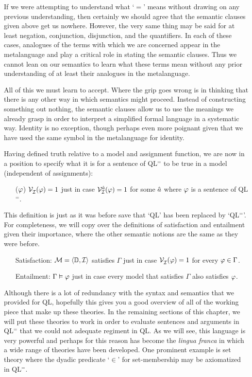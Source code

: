 If we were attempting to understand what `$=$' means without drawing on any previous understanding, then certainly we should agree that the semantic clauses given above get us nowhere.
However, the very same thing may be said for at least negation, conjunction, disjunction, and the quantifiers.
In each of these cases, analogues of the terms with which we are concerned appear in the metalanguage and play a critical role in stating the semantic clauses.
Thus we cannot lean on our semantics to learn what these terms mean without any prior understanding of at least their analogues in the metalanguage.

All of this we must learn to accept.
Where the grip goes wrong is in thinking that there is any other way in which semantics might proceed.
Instead of constructing something out nothing, the semantic clauses allow us to use the meanings we already grasp in order to interpret a simplified formal language in a systematic way.
Identity is no exception, though perhaps even more poignant given that we have used the same symbol in the metalanguage for identity.

Having defined truth relative to a model and assignment function, we are now in a position to specify what it is for a sentence of QL$^=$ to be true in a model (independent of assignments):

\begin{enumerate}[labelsep=.15in]
  \item[($\varphi$)] $\mathcal{V}_{\mathcal{I}}^{}(\varphi)=1$ just in case $\mathcal{V}_{\mathcal{I}}^{\hat{a}}(\varphi)=1$ for some $\hat{a}$ where $\varphi$ is a sentence of QL$^=$.
\end{enumerate}

This definition is just as it was before save that `QL' has been replaced by `QL$^=$'.
For completeness, we will copy over the definitions of satisfaction and entailment given their importance, where the other semantic notions are the same as they were before.

\begin{enumerate}[leftmargin=1.5in]
  \item[\sc Satisfaction:] $\mathcal{M}=\langle\mathbb{D},\mathcal{I}\rangle$ satisfies $\Gamma$ just in case $\mathcal{V}_{\mathcal{I}}^{}(\varphi)=1$ for every $\varphi\in\Gamma$.
  \item[\sc Entailment:] $\Gamma\vDash\varphi$ just in case every model that satisfies $\Gamma$ also satisfies $\varphi$.
\end{enumerate}

Although there is a lot of redundancy with the syntax and semantics that we provided for QL, hopefully this gives you a good overview of all of the working piece that make up these theories.
In the remaining sections of this chapter, we will put these theories to work in order to evaluate sentences and arguments in QL$^=$ that we could not adequate regiment in QL.
As we will see, this language is very powerful and perhaps for this reason has become the \textit{lingua franca} in which a wide range of theories have been developed.
One prominent example is set theory where the dyadic predicate `$\in$' for set-membership may be axiomatized in QL$^=$.







